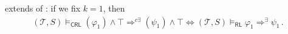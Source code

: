 \documentclass{article}
\newcommand{\traian}[1]{\todo[author=Traian]{#1}}
\newcommand{\RL}{\mathsf{RL}}
\newcommand{\CRL}{\mathsf{CRL}}
\newcommand{\Tcfg}{\mathcal{T}_{\mathit{Cfg}}}
\begin{document}

\begin{remark}
 extends  of :
if we fix $k=1$, then
\begin{align*}
    (\mathcal{T}, S) \vDash_\CRL
    (\varphi_1) \land \top  \Rightarrow^{c\exists}
    (\psi_1) \land \top
    \iff
    (\mathcal{T}, S) \vDash_\RL \varphi_1 \Rightarrow^{\exists} \psi_1 \, .
\end{align*}
\end{remark}

\end{document}
